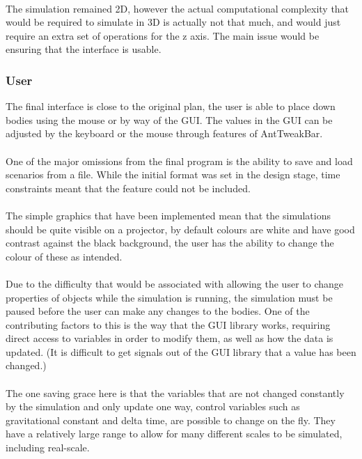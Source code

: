 \paragraph{}
The simulation remained 2D, however the actual computational complexity that would be required to simulate in 3D is actually not that much, and would just require an extra set of operations for the z axis. The main issue would be ensuring that the interface is usable.

\subsubsection{User}
The final interface is close to the original plan, the user is able to place down bodies using the mouse or by way of the GUI. The values in the GUI can be adjusted by the keyboard or the mouse through features of AntTweakBar.

\paragraph{}
One of the major omissions from the final program is the ability to save and load scenarios from a file. While the initial format was set in the design stage, time constraints meant that the feature could not be included.

\paragraph{}
The simple graphics that have been implemented mean that the simulations should be quite visible on a projector, by default colours are white and have good contrast against the black background, the user has the ability to change the colour of these as intended.

\paragraph{}
Due to the difficulty that would be associated with allowing the user to change properties of objects while the simulation is running, the simulation must be paused before the user can make any changes to the bodies. One of the contributing factors to this is the way that the GUI library works, requiring direct access to variables in order to modify them, as well as how the data is updated. (It is difficult to get signals out of the GUI library that a value has been changed.)

\paragraph{}
The one saving grace here is that the variables that are not changed constantly by the simulation and only update one way, control variables such as gravitational constant and delta time, are possible to change on the fly. They have a relatively large range to allow for many different scales to be simulated, including real-scale.


